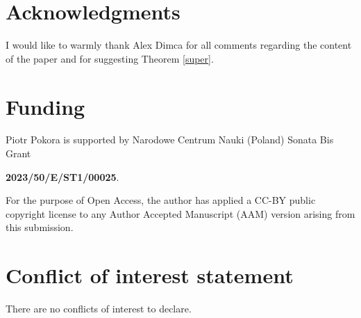 \documentclass[11pt]{article}
\theoremstyle{plain}
\theoremstyle{definition}
\theoremstyle{remark}
\begin{document}
\section*{Acknowledgments}
I would like to warmly thank Alex Dimca for all comments regarding the content of the paper and for suggesting Theorem \ref{super}.
\section*{Funding}
Piotr Pokora is supported by Narodowe Centrum Nauki (Poland) Sonata Bis Grant  
\begin{center}
\textbf{2023/50/E/ST1/00025}.    
\end{center} For the purpose of Open Access, the author has applied a CC-BY public copyright license to any Author Accepted Manuscript (AAM) version arising from this submission.

\section*{Conflict of interest statement}
There are no conflicts of interest to declare.
\end{document}
